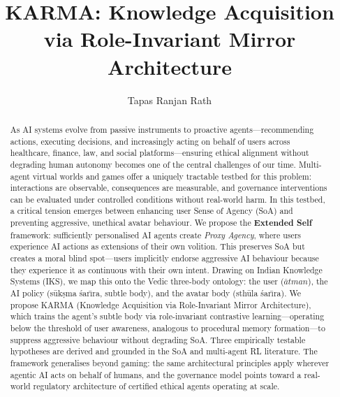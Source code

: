 \documentclass[runningheads]{llncs}
\begin{document}
\title{KARMA: Knowledge Acquisition via Role-Invariant Mirror Architecture}

\author{Tapas Ranjan Rath}

\maketitle

\begin{abstract}
As AI systems evolve from passive instruments to proactive agents---recommending
actions, executing decisions, and increasingly acting on behalf of users across
healthcare, finance, law, and social platforms---ensuring ethical alignment
without degrading human autonomy becomes one of the central challenges of our
time. Multi-agent virtual worlds and games offer a uniquely tractable testbed
for this problem: interactions are observable, consequences are measurable, and
governance interventions can be evaluated under controlled conditions without
real-world harm. In this testbed, a critical tension emerges between enhancing
user Sense of Agency (SoA) and preventing aggressive, unethical avatar
behaviour. We propose the \textbf{Extended Self} framework: sufficiently
personalised AI agents create \textit{Proxy Agency}, where users experience
AI actions as extensions of their own volition. This preserves SoA but creates
a moral blind spot---users implicitly endorse aggressive AI behaviour because
they experience it as continuous with their own intent. Drawing on Indian
Knowledge Systems (IKS), we map this onto the Vedic three-body ontology: the
user ($\bar{a}tman$), the AI policy (s\={u}k\d{s}ma \'{s}ar\={\i}ra, subtle
body), and the avatar body (sth\={u}la \'{s}ar\={\i}ra). We propose KARMA
(Knowledge Acquisition via Role-Invariant Mirror Architecture), which trains
the agent's subtle body via role-invariant contrastive learning---operating
below the threshold of user awareness, analogous to procedural memory
formation---to suppress aggressive behaviour without degrading SoA. Three
empirically testable hypotheses are derived and grounded in the SoA and
multi-agent RL literature. The framework generalises beyond gaming: the same
architectural principles apply wherever agentic AI acts on behalf of humans,
and the governance model points toward a real-world regulatory architecture
of certified ethical agents operating at scale.
\end{abstract}
\end{document}
